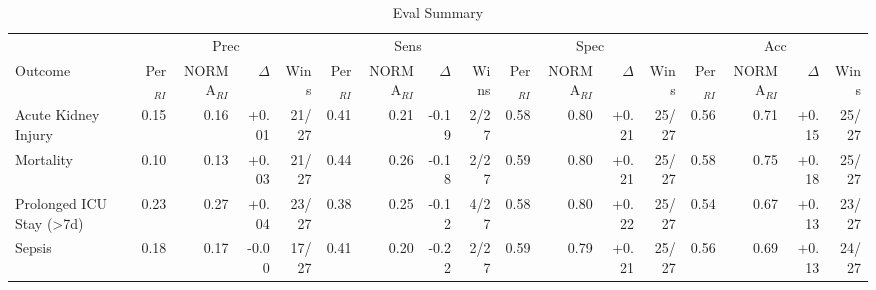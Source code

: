 \begin{table}[ht]
\centering
\footnotesize
\begin{tabular}{lrrrrrrrrrrrrrrrr}
\toprule
  & \multicolumn{4}{c}{Prec} & \multicolumn{4}{c}{Sens} & \multicolumn{4}{c}{Spec} & \multicolumn{4}{c}{Acc} \\
\cmidrule(lr){2-5} \cmidrule(lr){6-9} \cmidrule(lr){10-13} \cmidrule(lr){14-17}
Outcome & Per$_{RI}$ & NORMA$_{RI}$ & $\Delta$ & Wins & Per$_{RI}$ & NORMA$_{RI}$ & $\Delta$ & Wins & Per$_{RI}$ & NORMA$_{RI}$ & $\Delta$ & Wins & Per$_{RI}$ & NORMA$_{RI}$ & $\Delta$ & Wins \\
\midrule
Acute Kidney Injury & 0.15 & 0.16 & +0.01 & 21/27 & 0.41 & 0.21 & -0.19 & 2/27 & 0.58 & 0.80 & +0.21 & 25/27 & 0.56 & 0.71 & +0.15 & 25/27 \\
Mortality & 0.10 & 0.13 & +0.03 & 21/27 & 0.44 & 0.26 & -0.18 & 2/27 & 0.59 & 0.80 & +0.21 & 25/27 & 0.58 & 0.75 & +0.18 & 25/27 \\
Prolonged ICU Stay (>7d) & 0.23 & 0.27 & +0.04 & 23/27 & 0.38 & 0.25 & -0.12 & 4/27 & 0.58 & 0.80 & +0.22 & 25/27 & 0.54 & 0.67 & +0.13 & 23/27 \\
Sepsis & 0.18 & 0.17 & -0.00 & 17/27 & 0.41 & 0.20 & -0.22 & 2/27 & 0.59 & 0.79 & +0.21 & 25/27 & 0.56 & 0.69 & +0.13 & 24/27 \\
\bottomrule
\end{tabular}
\caption{Eval Summary}
\label{tab:eval_summary}
\end{table}